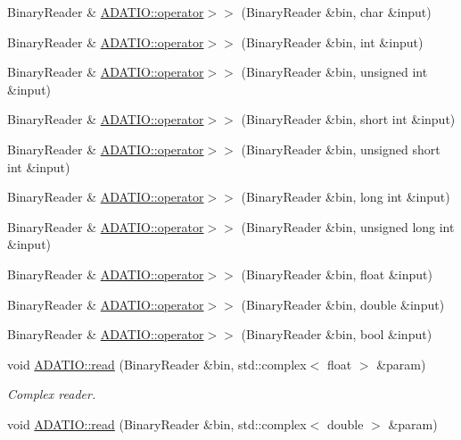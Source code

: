 \begin{DoxyCompactItemize}
Binary\+Reader \& \mbox{\hyperlink{namespaceADATIO_aa4d9d42917828a10055400b295736ad5}{A\+D\+A\+T\+I\+O\+::operator$>$$>$}} (Binary\+Reader \&bin, char \&input)
\item 
Binary\+Reader \& \mbox{\hyperlink{namespaceADATIO_a38e9b56ea3dfb8ea19ceb57783546c7c}{A\+D\+A\+T\+I\+O\+::operator$>$$>$}} (Binary\+Reader \&bin, int \&input)
\item 
Binary\+Reader \& \mbox{\hyperlink{namespaceADATIO_ae8319d36de40198210e78469c672e6d0}{A\+D\+A\+T\+I\+O\+::operator$>$$>$}} (Binary\+Reader \&bin, unsigned int \&input)
\item 
Binary\+Reader \& \mbox{\hyperlink{namespaceADATIO_af1565fd78ef164ff9cd892d032189f03}{A\+D\+A\+T\+I\+O\+::operator$>$$>$}} (Binary\+Reader \&bin, short int \&input)
\item 
Binary\+Reader \& \mbox{\hyperlink{namespaceADATIO_a1252900b43fa1caf87beea30ea4d5d76}{A\+D\+A\+T\+I\+O\+::operator$>$$>$}} (Binary\+Reader \&bin, unsigned short int \&input)
\item 
Binary\+Reader \& \mbox{\hyperlink{namespaceADATIO_ab87e32e5cce14b02718ac9c25a238bdd}{A\+D\+A\+T\+I\+O\+::operator$>$$>$}} (Binary\+Reader \&bin, long int \&input)
\item 
Binary\+Reader \& \mbox{\hyperlink{namespaceADATIO_a60c265c9f81ae202821e863e6db5f56f}{A\+D\+A\+T\+I\+O\+::operator$>$$>$}} (Binary\+Reader \&bin, unsigned long int \&input)
\item 
Binary\+Reader \& \mbox{\hyperlink{namespaceADATIO_a61d7b17123532c52a896c68a7524e924}{A\+D\+A\+T\+I\+O\+::operator$>$$>$}} (Binary\+Reader \&bin, float \&input)
\item 
Binary\+Reader \& \mbox{\hyperlink{namespaceADATIO_a2f66b1bc36b75ce131795f596985e5dc}{A\+D\+A\+T\+I\+O\+::operator$>$$>$}} (Binary\+Reader \&bin, double \&input)
\item 
Binary\+Reader \& \mbox{\hyperlink{namespaceADATIO_a540603b862dd578f7d9e187b2a0b7380}{A\+D\+A\+T\+I\+O\+::operator$>$$>$}} (Binary\+Reader \&bin, bool \&input)
\item 
void \mbox{\hyperlink{namespaceADATIO_aa439c7d6dfc63d8424816de24810141d}{A\+D\+A\+T\+I\+O\+::read}} (Binary\+Reader \&bin, std\+::complex$<$ float $>$ \&param)
\begin{DoxyCompactList}\small\item\em Complex reader. \end{DoxyCompactList}\item 
void \mbox{\hyperlink{namespaceADATIO_a99479bf376afa5196fad6684a360c7af}{A\+D\+A\+T\+I\+O\+::read}} (Binary\+Reader \&bin, std\+::complex$<$ double $>$ \&param)

\end{DoxyCompactItemize}
